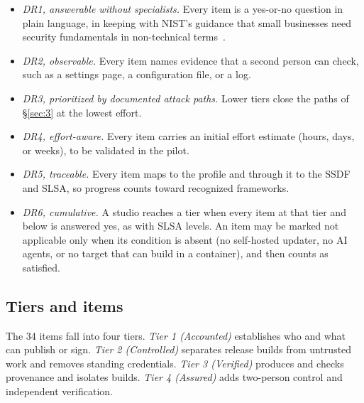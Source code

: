 \documentclass[acmsmall,screen,review]{acmart}
\begin{document}
\begin{itemize}
\item \emph{DR1, answerable without specialists.} Every item is a yes-or-no question in plain language, in keeping with NIST's guidance that small businesses need security fundamentals in non-technical terms~\cite{paulsen2016small}.
\item \emph{DR2, observable.} Every item names evidence that a second person can check, such as a settings page, a configuration file, or a log.
\item \emph{DR3, prioritized by documented attack paths.} Lower tiers close the paths of \S\ref{sec:3} at the lowest effort.
\item \emph{DR4, effort-aware.} Every item carries an initial effort estimate (hours, days, or weeks), to be validated in the pilot.
\item \emph{DR5, traceable.} Every item maps to the profile and through it to the SSDF and SLSA, so progress counts toward recognized frameworks.
\item \emph{DR6, cumulative.} A studio reaches a tier when every item at that tier and below is answered yes, as with SLSA levels. An item may be marked not applicable only when its condition is absent (no self-hosted updater, no AI agents, or no target that can build in a container), and then counts as satisfied.
\end{itemize}


\subsection{Tiers and items}\label{sec:6.4}

The 34 items fall into four tiers. \emph{Tier 1 (Accounted)} establishes who and what can publish or sign. \emph{Tier 2 (Controlled)} separates release builds from untrusted work and removes standing credentials. \emph{Tier 3 (Verified)} produces and checks provenance and isolates builds. \emph{Tier 4 (Assured)} adds two-person control and independent verification.
\end{document}
